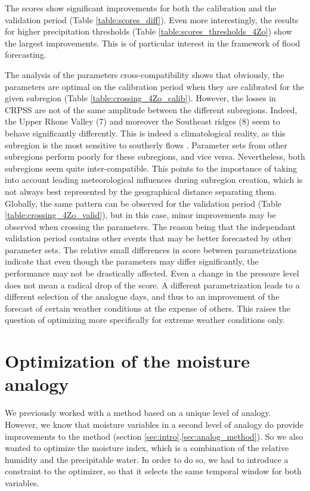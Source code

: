 \documentclass[5p]{elsarticle}
\begin{document}
The scores show significant improvements for both the calibration and the validation period (Table \ref{table:scores_diff}). Even more interestingly, the results for higher precipitation thresholds (Table \ref{table:scores_thresholds_4Zo}) show the largest improvements. This is of particular interest in the framework of flood forecasting.

The analysis of the parameters cross-compatibility shows that obviously, the parameters are optimal on the calibration period when they are calibrated for the given subregion (Table \ref{table:crossing_4Zo_calib}). However, the losses in CRPSS are not of the same amplitude between the different subregions. Indeed, the Upper Rhone Valley (7) and moreover the Southeast ridges (8) seem to behave significantly differently. This is indeed a climatological reality, as this subregion is the most sensitive to southerly flows \citep{Horton2012}. Parameter sets from other subregions perform poorly for these subregions, and vice versa. Nevertheless, both subregions seem quite inter-compatible. This points to the importance of taking into account leading meteorological influences during subregion creation, which is not always best represented by the geographical distance separating them. Globally, the same pattern can be observed for the validation period (Table \ref{table:crossing_4Zo_valid}), but in this case, minor improvements may be observed when crossing the parameters. The reason being that the independant validation period contains other events that may be better forecasted by other parameter sets. The relative small differences in score between parametrizations indicate that even though the parameters may differ significantly, the performance may not be drastically affected. Even a change in the pressure level does not mean a radical drop of the score. A different parametrization leads to a different selection of the analogue days, and thus to an improvement of the forecast of certain weather conditions at the expense of others. This raises the question of optimizing more specifically for extreme weather conditions only. 


\section{Optimization of the moisture analogy}
\label{sec:optim_moisture}

We previously worked with a method based on a unique level of analogy. However, we know that moisture variables in a second level of analogy do provide improvements to the method (section \ref{sec:intro}.\ref{sec:analog_method}). So we also wanted to optimize the moisture index, which is a combination of the relative humidity and the precipitable water. In order to do so, we had to introduce a constraint to the optimizer, so that it selects the same temporal window for both variables. 
\end{document}
